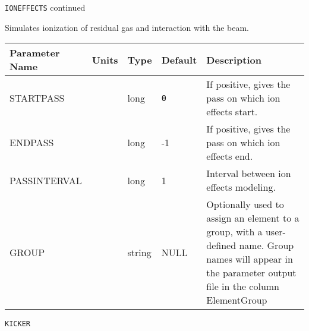 \newpage
\begin{center}{\Large\verb|IONEFFECTS| continued}\end{center}
Simulates ionization of residual gas and interaction with the beam.
\\
\begin{tabular}{|l|l|l|l|p{\descwidth}|} \hline
Parameter Name & Units & Type & Default & Description \\ \hline 
STARTPASS &  & long &  \verb|0| & If positive, gives the pass on which ion effects start.  \\ \hline 
ENDPASS &  & long &   -1              & If positive, gives the pass on which ion effects end.  \\ \hline 
PASSINTERVAL &  & long &   1               & Interval between ion effects modeling.  \\ \hline 
GROUP &  & string & NULL & Optionally used to assign an element to a group, with a user-defined name.  Group names will appear in the parameter output file in the column ElementGroup  \\ \hline 
\end{tabular}

\vspace*{0.5in}

\newpage
\begin{center}{\Large\verb|KICKER|}\end{center}
